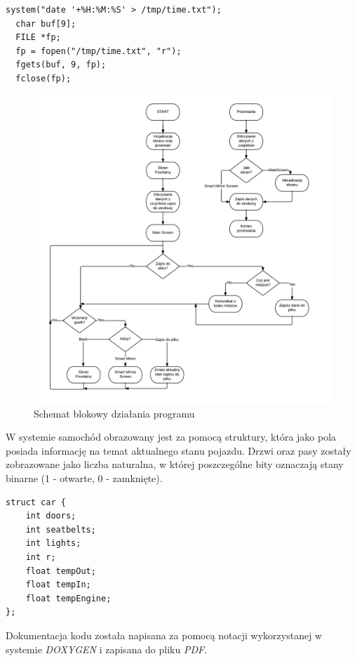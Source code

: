 \documentclass{xmgr}
\begin{document}
\begin{lstlisting}[label=bot-dirs-alg,caption=Odczyt aktualnej daty]
  system("date '+%H:%M:%S' > /tmp/time.txt");
  char buf[9];
  FILE *fp;
  fp = fopen("/tmp/time.txt", "r");
  fgets(buf, 9, fp);
  fclose(fp);
\end{lstlisting}

\begin{figure}[!h]
    \centering
    	\includegraphics[height=0.6\textheight]{images/codeDiagram.png}
    \caption{Schemat blokowy działania programu}
\end{figure}

W systemie samochód obrazowany jest za pomocą struktury, która jako pola posiada informację na temat aktualnego stanu pojazdu. Drzwi oraz pasy zostały zobrazowane jako liczba naturalna, w której poszczególne bity oznaczają stany binarne (1 - otwarte, 0 - zamknięte).

\begin{lstlisting}[label=bot-dirs-alg,caption=Struktura samochodu w programie]
struct car {
	int doors;
 	int seatbelts;
 	int lights;         
 	int r;
 	float tempOut;
 	float tempIn;
 	float tempEngine;
};
\end{lstlisting}

Dokumentacja kodu została napisana za pomocą notacji wykorzystanej w systemie \emph{DOXYGEN} i zapisana do pliku \emph{PDF}.
\end{document}
